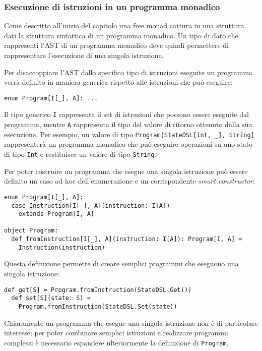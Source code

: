 \subsubsection{Esecuzione di istruzioni in un programma monadico}
Come descritto all'inizio del capitolo una free monad cattura in una struttura dati la struttura sintattica di un programma monadico.
Un tipo di dato che rappresenti l'AST di un programma monadico deve quindi permettere di rappresentare l'esecuzione di una singola istruzione.

Per disaccoppiare l'AST dallo specifico tipo di istruzioni eseguite un programma verrà definito in maniera generica rispetto alle istruzioni che può eseguire:
\begin{lstlisting}[language=scala3]
enum Program[I[_], A]: ...
\end{lstlisting}
Il tipo generico \lstinline{I} rappresenta il set di istruzioni che possono essere eseguite dal programma, mentre \lstinline{A} rappresenta il tipo del valore di ritorno ottenuto dalla sua esecuzione. Per esempio, un valore di tipo \lstinline{Program[StateDSL[Int, _], String]} rappresenterà un programma monadico che può eseguire operazioni su uno stato di tipo \lstinline{Int} e restituisce un valore di tipo \lstinline{String}.

Per poter costruire un programma che esegue una singola istruzione può essere definito un caso ad hoc dell'enumerazione e un corrispondente \emph{smart constructor}:
\begin{lstlisting}[language=scala3]
enum Program[I[_], A]:
  case Instruction[I[_], A](instruction: I[A])
    extends Program[I, A]

object Program:
  def fromInstruction[I[_], A](instruction: I[A]): Program[I, A] =
    Instruction(instruction)
\end{lstlisting}

Questa definizione permette di creare semplici programmi che eseguono una singola istruzione:
\begin{lstlisting}[language=scala3]
  def get[S] = Program.fromInstruction(StateDSL.Get())
  def set[S](state: S) =
    Program.fromInstruction(StateDSL.Set(state))
\end{lstlisting}

Chiaramente un programma che esegue una singola istruzione non è di particolare interesse; per poter combinare semplici istruzioni e realizzare programmi complessi è necessario espandere ulteriormente la definizione di \lstinline{Program}.

